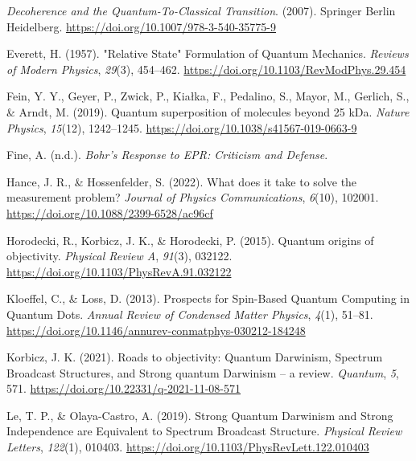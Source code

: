 \documentclass[
]{article}
\newlength{\cslhangindent}
\newenvironment{CSLReferences}[2] %
 {\begin{list}{}{%
  \setlength{\itemindent}{0pt}
  \setlength{\leftmargin}{0pt}
  \setlength{\parsep}{0pt}
  \ifodd #1
   \setlength{\leftmargin}{\cslhangindent}
   \setlength{\itemindent}{-1\cslhangindent}
  \fi
  \setlength{\itemsep}{#2\baselineskip}}}
 {\end{list}}
\begin{document}
\protect{}\label{refs}
\begin{CSLReferences}{1}{0}
\emph{Decoherence and the {Quantum-To-Classical Transition}}. (2007).
Springer Berlin Heidelberg.
\url{https://doi.org/10.1007/978-3-540-35775-9}

Everett, H. (1957). "{Relative State}" {Formulation} of {Quantum
Mechanics}. \emph{Reviews of Modern Physics}, \emph{29}(3), 454--462.
\url{https://doi.org/10.1103/RevModPhys.29.454}

Fein, Y. Y., Geyer, P., Zwick, P., Kiałka, F., Pedalino, S., Mayor, M.,
Gerlich, S., \& Arndt, M. (2019). Quantum superposition of molecules
beyond 25 {kDa}. \emph{Nature Physics}, \emph{15}(12), 1242--1245.
\url{https://doi.org/10.1038/s41567-019-0663-9}

Fine, A. (n.d.). \emph{Bohr's {Response} to {EPR}: {Criticism} and
{Defense}}.

Hance, J. R., \& Hossenfelder, S. (2022). What does it take to solve the
measurement problem? \emph{Journal of Physics Communications},
\emph{6}(10), 102001. \url{https://doi.org/10.1088/2399-6528/ac96cf}

Horodecki, R., Korbicz, J. K., \& Horodecki, P. (2015). Quantum origins
of objectivity. \emph{Physical Review A}, \emph{91}(3), 032122.
\url{https://doi.org/10.1103/PhysRevA.91.032122}

Kloeffel, C., \& Loss, D. (2013). Prospects for {Spin-Based Quantum
Computing} in {Quantum Dots}. \emph{Annual Review of Condensed Matter
Physics}, \emph{4}(1), 51--81.
\url{https://doi.org/10.1146/annurev-conmatphys-030212-184248}

Korbicz, J. K. (2021). Roads to objectivity: {Quantum Darwinism},
{Spectrum Broadcast Structures}, and {Strong} quantum {Darwinism} -- a
review. \emph{Quantum}, \emph{5}, 571.
\url{https://doi.org/10.22331/q-2021-11-08-571}

Le, T. P., \& Olaya-Castro, A. (2019). Strong {Quantum Darwinism} and
{Strong Independence} are {Equivalent} to {Spectrum Broadcast
Structure}. \emph{Physical Review Letters}, \emph{122}(1), 010403.
\url{https://doi.org/10.1103/PhysRevLett.122.010403}


\end{CSLReferences}
\end{document}
